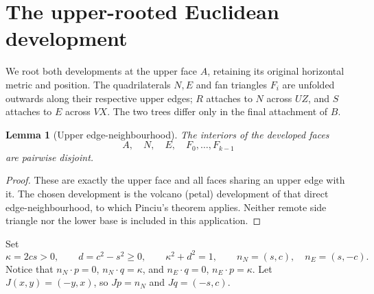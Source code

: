 \documentclass[11pt]{amsart}
\newtheorem{lemma}[theorem]{Lemma}
\begin{document}
\section{The upper-rooted Euclidean development}
We root both developments at the upper face \(A\), retaining its original horizontal metric and position. The quadrilaterals \(N,E\) and fan triangles \(F_i\) are unfolded outwards along their respective upper edges; \(R\) attaches to \(N\) across \(UZ\), and \(S\) attaches to \(E\) across \(VX\). The two trees differ only in the final attachment of \(B\).

\begin{lemma}[Upper edge-neighbourhood]\label{lem:pinciu}
The interiors of the developed faces
\[
 A,\quad N,\quad E,\quad F_0,\ldots,F_{k-1}
\]
are pairwise disjoint.
\end{lemma}
\begin{proof}
These are exactly the upper face and all faces sharing an upper edge with it. The chosen development is the volcano (petal) development of that direct edge-neighbourhood, to which Pinciu's theorem \cite[Theorem~1]{pinciu2007} applies. Neither remote side triangle nor the lower base is included in this application.
\end{proof}

Set
\begin{equation}\label{eq:kappad}
 \kappa=2cs>0,\qquad d=c^2-s^2\ge0,\qquad \kappa^2+d^2=1,
 \qquad n_N=(s,c),\quad n_E=(s,-c).
\end{equation}
Notice that \(n_N\cdot p=0\), \(n_N\cdot q=\kappa\), and \(n_E\cdot q=0\), \(n_E\cdot p=\kappa\). Let \(J(x,y)=(-y,x)\), so \(Jp=n_N\) and \(Jq=(-s,c)\).
\end{document}
